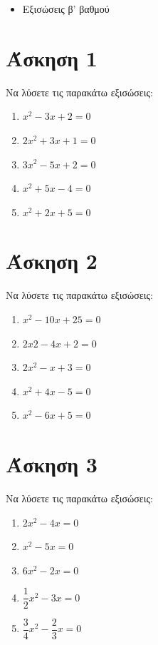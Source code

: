 \documentclass[a4paper,10pt]{report}
\begin{document}
\vspace{2em}
\begin{itemize}
\item Εξισώσεις β' βαθμού
\end{itemize}

\section*{Άσκηση 1  \hfill \small{}}
Να λύσετε τις παρακάτω εξισώσεις:
\begin{enumerate}[1)]
 \item $x^{2}-3x+2=0$ 
 \item $2x^{2}+3x+1=0$
 \item $3x^{2}-5x+2=0$
 \item $x^{2}+5x-4=0$
 \item $x^{2}+2x+5=0$
\end{enumerate}


\section*{Άσκηση 2  \hfill \small{}}
Να λύσετε τις παρακάτω εξισώσεις:
\begin{enumerate}[1)]
 \item $x^{2}-10x+25=0$
 \item $2x{2}-4x+2=0$
 \item $2x^{2}-x+3=0$
 \item $x^{2}+4x-5=0$
 \item $x^{2}-6x+5=0$
\end{enumerate}

\section*{Άσκηση 3  \hfill \small{}}
Να λύσετε τις παρακάτω εξισώσεις:
\begin{enumerate}[1)]
 \item $2x^{2}-4x=0$
 \item $x^{2}-5x=0$
 \item $6x^{2}-2x=0$
 \item $\dfrac{1}{2}x^{2}-3x=0$
 \item $\dfrac{3}{4}x^{2}-\dfrac{2}{3}x=0$
\end{enumerate}
\end{document}
